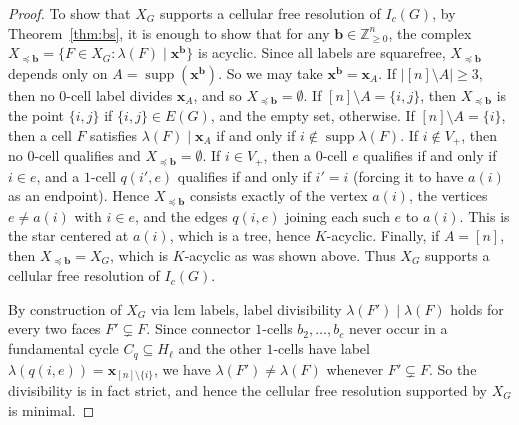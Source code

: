 \documentclass[12pt]{amsart}
\begin{document}
\begin{proof}
			To show that $X_G$ supports a cellular free resolution of $I_c(G)$, by Theorem~\ref{thm:bs}, it is enough to show that for any $\mathbf b\in\mathbb Z_{\ge0}^n$, the complex $X_{\preceq\mathbf b}=\{F\in X_G:\lambda(F)\mid \mathbf x^{\mathbf b}\}$ is acyclic. Since all labels are squarefree, $X_{\preceq \mathbf b}$ depends only on $A=\operatorname{supp}(\mathbf x^{\mathbf b})$. So we may take $\mathbf x^{\mathbf b}=\mathbf x_A$. If $|[n]\setminus A|\ge 3$, then no $0$-cell label divides $\mathbf x_A$, and so $X_{\preceq\mathbf b}=\emptyset$.
If $[n]\setminus A=\{i,j\}$, then  $X_{\preceq\mathbf b}$ is the point $\{i,j\}$ if $\{i,j\}\in E(G)$, and the empty set, otherwise.
If $[n]\setminus A=\{i\}$, then  
a cell $F$ satisfies $\lambda(F)\mid \mathbf x_A$ if and only if $i\notin\operatorname{supp}\lambda(F)$. If $i\notin V_+$, then no $0$-cell qualifies and $X_{\preceq\mathbf b}=\emptyset$. If $i\in V_+$, then a $0$-cell $e$ qualifies if and only if $i\in e$, and a $1$-cell $q(i',e)$ qualifies if and only if $i'=i$ (forcing it to have $a(i)$ as an endpoint). Hence $X_{\preceq\mathbf b}$ consists exactly of the vertex $a(i)$, the vertices $e\ne a(i)$ with $i\in e$, and the edges $q(i,e)$ joining each such $e$ to $a(i)$. This is the star centered at $a(i)$, which is a tree, hence $K$-acyclic.
Finally, if	$A=[n]$, then $X_{\preceq\mathbf b}=X_G$, which is $K$-acyclic as was shown above.
Thus $X_G$ supports a cellular free resolution of $I_c(G)$.
				
By construction of $X_G$ via lcm labels, label divisibility $\lambda(F')\mid\lambda(F)$ holds for every two faces $F'\subsetneq F$. Since connector $1$-cells $b_2,\dots,b_c$ never occur in a fundamental cycle $C_q\subseteq H_\ell$ and the other $1$-cells have label $\lambda(q(i,e))=\mathbf x_{[n]\setminus\{i\}}$, we have $\lambda(F')\ne\lambda(F)$ whenever $F'\subsetneq F$. 	So the divisibility is in fact strict, and hence the cellular free resolution supported by $X_G$ is minimal.
\end{proof}
\end{document}

